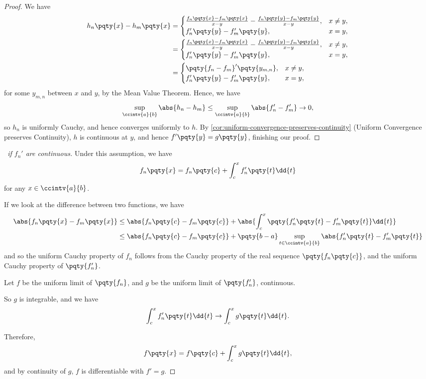 \begin{proof}
    We have
    \begin{align*}
        h_n\pqty{x} - h_m\pqty{x} &= \begin{cases}
            \frac{f_n\pqty{x} - f_m\pqty{x}}{x - y} - \frac{f_n\pqty{y} - f_m\pqty{y}}{x - y}, & x \neq y, \\
            f_n'\pqty{y} - f_m'\pqty{y}, & x = y,
        \end{cases} \\
        &= \begin{cases}
            \frac{f_n\pqty{x} - f_m\pqty{x}}{x - y} - \frac{f_n\pqty{y} - f_m\pqty{y}}{x - y}, & x \neq y, \\
            f_n'\pqty{y} - f_m'\pqty{y}, & x = y,
        \end{cases} \\
        &= \begin{cases}
            \pqty{f_n - f_m}' \pqty{y_{m, n}}, & x \neq y, \\
            f_n'\pqty{y} - f_m'\pqty{y}, & x = y,
        \end{cases}
    \end{align*}
    for some \(y_{m, n}\) between \(x\) and \(y\), by the Mean Value Theorem. Hence, we have
    \[
        \sup_{\ccintv{a}{b}} \abs{h_n - h_m} \leq \sup_{\ccintv{a}{b}} \abs{f_n' - f_m'} \to 0,
    \]
    so \(h_n\) is uniformly Cauchy, and hence converges uniformly to \(h\). By \autoref{cor:uniform-convergence-preserves-continuity} (Uniform Convergence preserves Continuity), \(h\) is continuous at \(y\), and hence \(f'\pqty{y} = g\pqty{y}\), finishing our proof.
\end{proof}

\begin{proof}[\proofname\ if \(f_n'\) are continuous]
    Under this assumption, we have
    \[
        f_n\pqty{x} = f_n\pqty{c} + \int_{c}^{x} f_n'\pqty{t} \dd{t}
    \]
    for any \(x \in \ccintv{a}{b}\).

    If we look at the difference between two functions, we have
    \begin{align*}
        \abs{f_n\pqty{x} - f_m\pqty{x}} &\leq \abs{f_n\pqty{c} - f_m\pqty{c}} + \abs{\int_{c}^{x} \pqty{f_n' \pqty{t} - f_m'\pqty{t}} \dd{t}} \\
        &\leq \abs{f_n\pqty{c} - f_m\pqty{c}} + \pqty{b - a} \sup_{t \in \ccintv{a}{b}} \abs{f_n'\pqty{t} - f_m'\pqty{t}}
    \end{align*}
    and so the uniform Cauchy property of \(f_n\) follows from the Cauchy property of the real sequence \(\pqty{f_n\pqty{c}}\), and the uniform Cauchy property of \(\pqty{f_n'}\).

    Let \(f\) be the uniform limit of \(\pqty{f_n}\), and \(g\) be the uniform limit of \(\pqty{f_n'}\), continuous.

    So \(g\) is integrable, and we have
    \[
        \int_{c}^{x} f_n'\pqty{t} \dd{t} \to \int_{c}^{x} g\pqty{t} \dd{t}.
    \]

    Therefore,
    \[
        f\pqty{x} = f\pqty{c} + \int_{c}^{x} g\pqty{t} \dd{t},
    \]
    and by continuity of \(g\), \(f\) is differentiable with \(f' = g\).
\end{proof}

